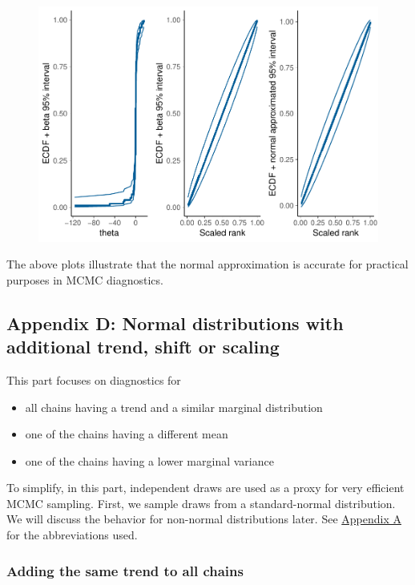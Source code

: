 \documentclass[american,]{article}
\providecommand{\tightlist}{%
  \setlength{\itemsep}{0pt}\setlength{\parskip}{0pt}}
\begin{document}
\begin{figure}[tp]
  \centering
  \includegraphics[width=0.6\linewidth]{graphics/ranknorm-cauchy3-1.pdf}
\end{figure}

The above plots illustrate that the normal approximation is accurate for
practical purposes in MCMC diagnostics.

\FloatBarrier

\hypertarget{AppendixD}{%
\subsection*{Appendix D: Normal distributions with additional trend,
shift or scaling}\label{AppendixD}}

This part focuses on diagnostics for

\begin{itemize}
\tightlist
\item
  all chains having a trend and a similar marginal distribution
\item
  one of the chains having a different mean
\item
  one of the chains having a lower marginal variance
\end{itemize}

To simplify, in this part, independent draws are used as a proxy for
very efficient MCMC sampling. First, we sample draws from a
standard-normal distribution. We will discuss the behavior for
non-normal distributions later. See
\protect\hyperlink{AppendixA}{Appendix A} for the abbreviations used.

\hypertarget{adding-the-same-trend-to-all-chains}{%
\subsubsection*{Adding the same trend to all
chains}\label{adding-the-same-trend-to-all-chains}}
\end{document}

